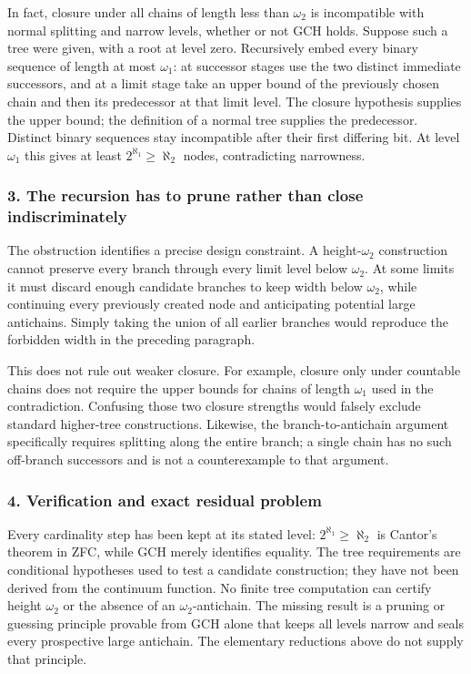 \documentclass[11pt,a4paper]{article}
\begin{document}
In fact, closure under all chains of length less than $\omega_2$ is incompatible with normal splitting and narrow levels, whether or not GCH holds. Suppose such a tree were given, with a root at level zero. Recursively embed every binary sequence of length at most $\omega_1$: at successor stages use the two distinct immediate successors, and at a limit stage take an upper bound of the previously chosen chain and then its predecessor at that limit level. The closure hypothesis supplies the upper bound; the definition of a normal tree supplies the predecessor. Distinct binary sequences stay incompatible after their first differing bit. At level $\omega_1$ this gives at least $2^{\aleph_1}\geq\aleph_2$ nodes, contradicting narrowness.

\subsubsection{3. The recursion has to prune rather than close indiscriminately}
The obstruction identifies a precise design constraint. A height-$\omega_2$ construction cannot preserve every branch through every limit level below $\omega_2$. At some limits it must discard enough candidate branches to keep width below $\omega_2$, while continuing every previously created node and anticipating potential large antichains. Simply taking the union of all earlier branches would reproduce the forbidden width in the preceding paragraph.

This does not rule out weaker closure. For example, closure only under countable chains does not require the upper bounds for chains of length $\omega_1$ used in the contradiction. Confusing those two closure strengths would falsely exclude standard higher-tree constructions. Likewise, the branch-to-antichain argument specifically requires splitting along the entire branch; a single chain has no such off-branch successors and is not a counterexample to that argument.

\subsubsection{4. Verification and exact residual problem}
Every cardinality step has been kept at its stated level: $2^{\aleph_1}\geq\aleph_2$ is Cantor's theorem in ZFC, while GCH merely identifies equality. The tree requirements are conditional hypotheses used to test a candidate construction; they have not been derived from the continuum function. No finite tree computation can certify height $\omega_2$ or the absence of an $\omega_2$-antichain. The missing result is a pruning or guessing principle provable from GCH alone that keeps all levels narrow and seals every prospective large antichain. The elementary reductions above do not supply that principle.
\end{document}
